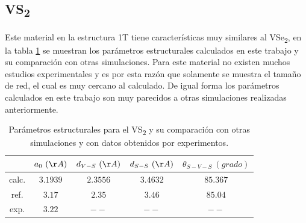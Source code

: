 \subsection{VS\textsubscript{2}} \label{Sim:subsec:VS2}
Este material en la estructura 1T tiene características muy similares al VSe\textsubscript{2}, en la tabla \ref{Sim:tabla:VS2est} se muestran los par\'ametros estructurales calculados en este trabajo y su comparaci\'on con otras simulaciones. Para este material no existen muchos estudios experimentales y es por esta raz\'on  que solamente se muestra el tama\~no de red, el cual es muy cercano al calculado. De igual forma los par\'ametros calculados en este trabajo son muy parecidos a  otras simulaciones realizadas anteriormente.

\begin{table}
	\centering
	\caption[Comparaci\'on de par\'ametros estructurales del VS\textsubscript{2}.]{Par\'ametros estructurales para el VS\textsubscript{2} y su comparaci\'on con otras simulaciones y con datos obtenidos por experimentos.}
\begin{tabular}{|c|c|c|c|c|}
	\hline
	& $a_0~(\AA)$   & $d_{V-S}~(\AA)$  & $d_{S-S}~(\AA)$  &  $\theta_{S-V-S}~(grado)$ \\
	\hline
	\hline
	calc.   & $3.1939$& $2.3556 $     & $3.4632 $  & $85.367$ \\
	ref. \cite{doi:10.1021/jp405808a}    & $3.17$& $2.35 $     & $3.46 $  & $85.04$ \\
	exp. \cite{C9QI01142K}   & $3.22$& $-- $     & $-- $  & $--$\\
	\hline
	
\end{tabular}
\label{Sim:tabla:VS2est}
\end{table}

